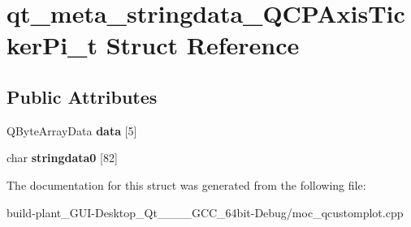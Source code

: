 \hypertarget{structqt__meta__stringdata__QCPAxisTickerPi__t}{}\section{qt\+\_\+meta\+\_\+stringdata\+\_\+\+Q\+C\+P\+Axis\+Ticker\+Pi\+\_\+t Struct Reference}
\label{structqt__meta__stringdata__QCPAxisTickerPi__t}
\subsection*{Public Attributes}
\begin{DoxyCompactItemize}
\item 
\mbox{\label{structqt__meta__stringdata__QCPAxisTickerPi__t_a9f99bf64eee1204b7290801f16f2f970}} 
Q\+Byte\+Array\+Data {\bfseries data} \mbox{[}5\mbox{]}
\item 
\mbox{\label{structqt__meta__stringdata__QCPAxisTickerPi__t_a09df8d6e526c01eb8d476aad32b2ab37}} 
char {\bfseries stringdata0} \mbox{[}82\mbox{]}
\end{DoxyCompactItemize}


The documentation for this struct was generated from the following file\+:\begin{DoxyCompactItemize}
\item 
build-\/plant\+\_\+\+G\+U\+I-\/\+Desktop\+\_\+\+Qt\+\_\+\_\+\_\+\_\+\+G\+C\+C\+\_\+64bit-\/\+Debug/moc\+\_\+qcustomplot.\+cpp\end{DoxyCompactItemize}
